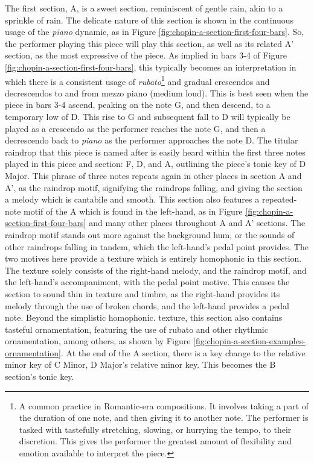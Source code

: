 The first section, A, is a sweet section, reminiscent of gentle rain, akin to a sprinkle of rain. The delicate nature of this section is shown in the continuous usage of the \textit{piano} dynamic, as in Figure \ref{fig:chopin-a-section-first-four-bars}\autocite{Hansen_1973}. So, the performer playing this piece will play this section, as well as its related A' section, as the most expressive of the piece. As implied in bars 3-4 of Figure \ref{fig:chopin-a-section-first-four-bars}\autocite{Hansen_1973}, this typically becomes an interpretation in which there is a consistent usage of \textit{rubato}\autocite{Cole_Schwartzb}\footnote{A common practice in Romantic-era compositions. It involves taking a part of the duration of one note, and then giving it to another note. The performer is tasked with tastefully stretching, slowing, or hurrying the tempo, to their discretion. This gives the performer the greatest amount of flexibility and emotion available to interpret the piece.} and gradual crescendos and decrescendos to and from mezzo piano (medium loud). This is best seen when the piece in bars 3-4 ascend, peaking on the note G, and then descend, to a temporary low of D. This rise to G and subsequent fall to D will typically be played as a crescendo as the performer reaches the note G, and then a decrescendo back to \textit{piano} as the performer approaches the note D. The titular raindrop that this piece is named after is easily heard within the first three notes played in this piece and section: F, D\musFlat{}, and A\musFlat{}, outlining the piece's tonic key of D\musFlat{} Major. This phrase of three notes repeats again in other places in section A and A', as the raindrop motif, signifying the raindrops falling, and giving the section a melody which is cantabile and smooth. This section also features a repeated-note motif of the A\musFlat{} which is found in the left-hand, as in Figure \ref{fig:chopin-a-section-first-four-bars}\autocite{Hansen_1973} and many other places throughout A and A' sections. The raindrop motif stands out more against the background hum, or the sounds of other raindrops falling in tandem, which the left-hand's pedal point provides. The two motives here provide a texture which is entirely homophonic in this section. The texture solely consists of the right-hand melody, and the raindrop motif, and the left-hand's accompaniment, with the pedal point motive. This causes the section to sound thin in texture and timbre, as the right-hand provides its melody through the use of broken chords, and the left-hand provides a pedal note. Beyond the simplistic homophonic. texture, this section also contains tasteful ornamentation, featuring the use of rubato and other rhythmic ornamentation, among others, as shown by Figure \ref{fig:chopin-a-section-examples-ornamentation}\autocite{Hansen_1973}. At the end of the A section, there is a key change to the relative minor key of C\musSharp{} Minor, D\musFlat{} Major's relative minor key. This becomes the B section's tonic key.

